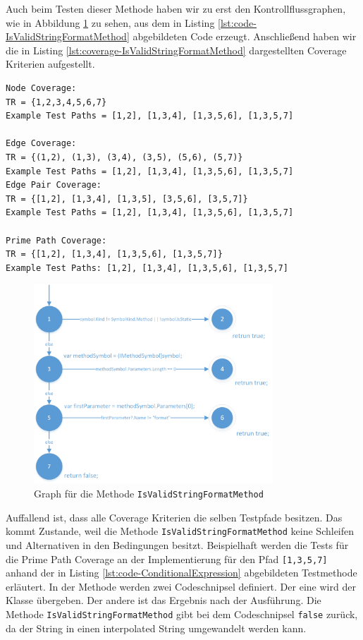 Auch beim Testen dieser Methode haben wir zu erst den Kontrollflussgraphen, wie in Abbildung \ref{fig:graph-validstring} zu sehen, aus dem in Listing \ref{lst:code-IsValidStringFormatMethod} abgebildeten Code erzeugt. Anschließend haben wir die in Listing \ref{lst:coverage-IsValidStringFormatMethod} dargestellten Coverage Kriterien aufgestellt.

\begin{lstlisting}[caption={Coverage für die Mehtode \texttt{IsValidStringFormatMethod}},
label=lst:coverage-IsValidStringFormatMethod]
Node Coverage:
TR = {1,2,3,4,5,6,7}
Example Test Paths = [1,2], [1,3,4], [1,3,5,6], [1,3,5,7]

Edge Coverage:
TR = {(1,2), (1,3), (3,4), (3,5), (5,6), (5,7)}
Example Test Paths = [1,2], [1,3,4], [1,3,5,6], [1,3,5,7]
Edge Pair Coverage:
TR = {[1,2], [1,3,4], [1,3,5], [3,5,6], [3,5,7]}
Example Test Paths = [1,2], [1,3,4], [1,3,5,6], [1,3,5,7]

Prime Path Coverage:
TR = {[1,2], [1,3,4], [1,3,5,6], [1,3,5,7]}
Example Test Paths: [1,2], [1,3,4], [1,3,5,6], [1,3,5,7]
\end{lstlisting}
\begin{figure}[h]
	\centering
	\includegraphics[width=0.8\textwidth]{images/GraphISValidStringFormatMethod.png}
	\caption{Graph für die Methode \texttt{IsValidStringFormatMethod}}
	\label{fig:graph-validstring}
\end{figure}
Auffallend ist, dass alle Coverage Kriterien die selben Testpfade besitzen. Das kommt Zustande, weil die Methode \texttt{IsValidStringFormatMethod} keine Schleifen und Alternativen in den Bedingungen besitzt. Beispielhaft werden die Tests für die Prime Path Coverage an der Implementierung für den Pfad \texttt{[1,3,5,7]} anhand der in Listing \ref{lst:code-ConditionalExpression} abgebildeten Testmethode erläutert. In der Methode werden zwei Codeschnipsel definiert. Der eine wird der Klasse übergeben. Der andere ist das Ergebnis nach der Ausführung. Die Methode \texttt{IsValidStringFormatMethod} gibt bei dem Codeschnipsel \texttt{false} zurück, da der String in einen interpolated String umgewandelt werden kann.

